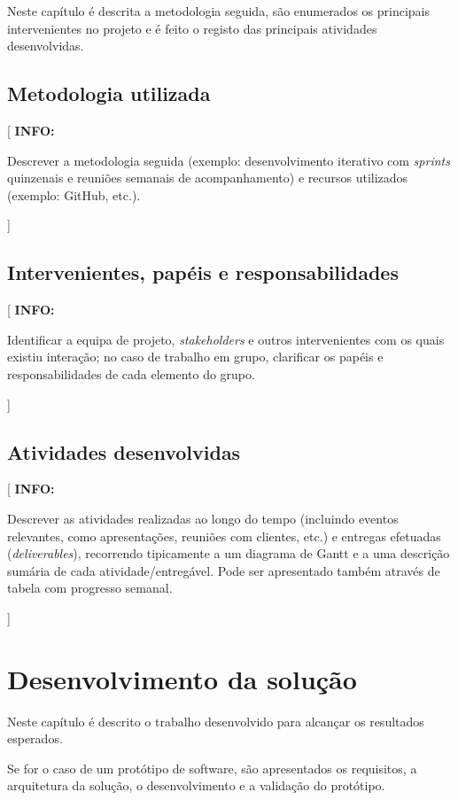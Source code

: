 \documentclass[11pt,a4paper]{report}
\newenvironment{info}[1]{\vspace*{6mm}\color{blue}[ \textbf{INFO:} \begin{em} #1}{\vspace*{3mm}\end{em} ]}
\begin{document}
Neste capítulo é descrita a metodologia seguida, são enumerados os
principais intervenientes no projeto e é feito o registo das
principais atividades desenvolvidas.

\section{Metodologia utilizada}

\begin{info}
Descrever a metodologia seguida (exemplo: desenvolvimento iterativo
com \emph{sprints} quinzenais e reuniões semanais de acompanhamento) e
recursos utilizados (exemplo: GitHub, etc.).
\end{info}

\section{Intervenientes, papéis e responsabilidades}

\begin{info}
Identificar a equipa de projeto, \emph{stakeholders} e outros
intervenientes com os quais existiu interação; no caso de trabalho em
grupo, clarificar os papéis e responsabilidades de cada elemento do grupo.
\end{info}

\section{Atividades desenvolvidas}

\begin{info}
Descrever as atividades realizadas ao longo do tempo (incluindo
eventos relevantes, como apresentações, reuniões com clientes, etc.)
e entregas efetuadas (\emph{deliverables}), recorrendo tipicamente a
um diagrama de Gantt e a uma descrição sumária de cada
atividade/entregável.
Pode ser apresentado também através de tabela com progresso semanal.
\end{info}


\chapter{Desenvolvimento da solução}

Neste capítulo é descrito o trabalho desenvolvido para alcançar os
resultados esperados.

Se for o caso de um protótipo de software, são apresentados os
requisitos, a arquitetura da solução, o desenvolvimento e a validação
do protótipo.
\end{document}
